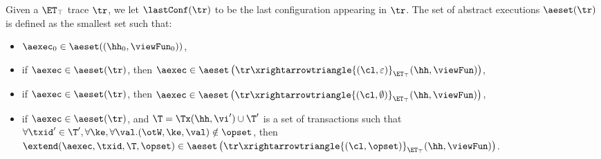 \begin{definition}
Given a $\ET_{\top}$ trace $\tr$, we let $\lastConf(\tr)$ to be the last configuration appearing in 
$\tr$. The set of abstract executions $\aeset(\tr)$ is defined as the smallest set such that:
\begin{itemize}
\item $\aexec_{0} \in \aeset((\hh_{0}, \viewFun_{0}))$, 
\item if $\aexec \in \aeset(\tr)$, then $\aexec \in \aeset\left(\tr \xrightarrowtriangle{(\cl, \varepsilon)}_{\ET_{\top}} (\hh, \viewFun) \right)$, 
\item if $\aexec \in \aeset(\tr)$, then $\aexec \in \aeset\left(\tr \xrightarrowtriangle{(\cl, \emptyset)}_{\ET_{\top}} (\hh, \viewFun) \right)$, 
\item if $\aexec \in \aeset(\tr)$, and $\T = \Tx(\hh, \vi') \cup \T'$ is a set of transactions such that 
$\forall \txid' \in \T', \forall \ke, \forall \val.(\otW, \ke, \val) \notin \opset$, then 
$\extend(\aexec, \txid, \T, \opset) \in \aeset\left(\tr \xrightarrowtriangle{(\cl, \opset)}_{\ET_{\top}} (\hh, \viewFun) \right)$.
\end{itemize}

\end{definition}

